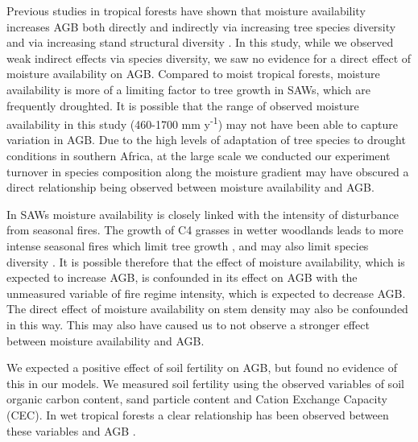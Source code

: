 \documentclass[11pt,a4paper]{article}
\newcommand{\textapprox}{\raisebox{0.5ex}{\texttildelow}}  %
\begin{document}
Previous studies in tropical forests have shown that moisture availability increases AGB both directly and indirectly via increasing tree species diversity and via increasing stand structural diversity \citep{Ali2019a, Ali2019b, Poorter2017}. In this study, while we observed weak indirect effects via species diversity, we saw no evidence for a direct effect of moisture availability on AGB. Compared to moist tropical forests, moisture availability is more of a limiting factor to tree growth in SAWs, which are frequently droughted. It is possible that the range of observed moisture availability in this study (\textapprox{}460-1700 mm y\textsuperscript{-1}) may not have been able to capture variation in AGB. Due to the high levels of adaptation of tree species to drought conditions in southern Africa, at the large scale we conducted our experiment turnover in species composition along the moisture gradient may have obscured a direct relationship being observed between moisture availability and AGB.

In SAWs moisture availability is closely linked with the intensity of disturbance from seasonal fires. The growth of C4 grasses in wetter woodlands leads to more intense seasonal fires which limit tree growth \citep{Charles-Dominique2018}, and may also limit species diversity \citep{Linder2014}. It is possible therefore that the effect of moisture availability, which is expected to increase AGB, is confounded in its effect on AGB with the unmeasured variable of fire regime intensity, which is expected to decrease AGB. The direct effect of moisture availability on stem density may also be confounded in this way. This may also have caused us to not observe a stronger effect between moisture availability and AGB.

We expected a positive effect of soil fertility on AGB, but found no evidence of this in our models. We measured soil fertility using the observed variables of soil organic carbon content, sand particle content and Cation Exchange Capacity (CEC). In wet tropical forests a clear relationship has been observed between these variables and AGB \citep{Slik2010, MORE}. 

\end{document}
